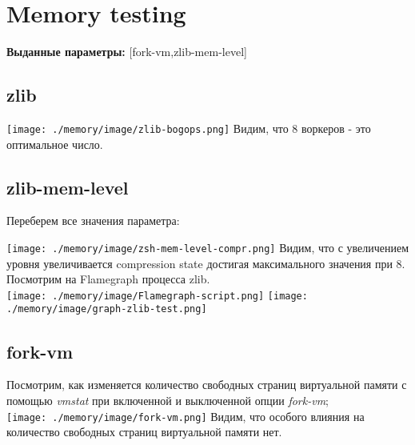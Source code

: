 \section{Memory testing}
\textbf{Выданные параметры:} [fork-vm,zlib-mem-level]
\subsection{zlib}
\texttt{[image: ./memory/image/zlib-bogops.png]}
Видим, что 8 воркеров - это оптимальное число.
\subsection{zlib-mem-level}
Переберем все значения параметра:

\texttt{[image: ./memory/image/zsh-mem-level-compr.png]}
Видим, что с увеличением уровня увеличивается compression state достигая максимального значения при 8.\\
Посмотрим на Flamegraph процесса zlib.\\
\texttt{[image: ./memory/image/Flamegraph-script.png]}
\texttt{[image: ./memory/image/graph-zlib-test.png]}
\subsection{fork-vm}
Посмотрим, как изменяется количество свободных страниц виртуальной памяти с помощью \textit{vmstat} при включенной и выключенной опции \textit{fork-vm};\\
\texttt{[image: ./memory/image/fork-vm.png]}
Видим, что особого влияния на количество свободных страниц виртуальной памяти нет.\\
